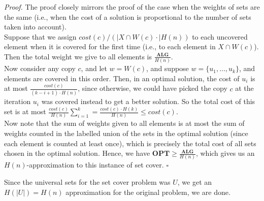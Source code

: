 \documentclass[a4paper]{article}
\newenvironment{proof}{\begin{breakbox}\textit{Proof.}}{\hfill$\square$\end{breakbox}}
\newcommand{\nl}{\vspace{0.2cm}\\}
\newcommand{\OPT}{\mathbf{OPT}}
\newcommand{\ALG}{\mathbf{ALG}}
\begin{document}
\begin{proof}
    The proof closely mirrors the proof of the case when the weights of sets are the same (i.e., when the cost of a solution is proportional to the number of sets taken into account).\nl
    Suppose that we assign $cost(c) / (|X \cap W(c)\cdot |H(n))$ to each uncovered element when it is covered for the first time (i.e., to each element in $X \cap W(c)$). Then the total weight we give to all
    elements is $\frac{\ALG}{H(n)}$.\nl
    Now consider any copy $c$, and let $w = W(c)$, and suppose $w = \{u_1, \ldots, u_k\}$, and elements are covered in this order. Then, in an optimal solution, the cost of $u_i$ is at most
    $\frac{cost(c)}{(k - i + 1) \cdot H(n)}$, since otherwise, we could have picked the copy $c$ at the iteration $u_i$ was covered instead to get a better solution. So the total cost of this set
    is at most $\frac{cost(c)}{H(n)} \sum_{i = 1}^k = \frac{cost(c) \cdot H(k)}{H(n)} \le cost(c)$.\nl
    Now note that the sum of weights given to all elements is at most the sum of weights counted in the labelled union of the sets in the optimal solution (since each element is counted at
    least once), which is precisely the total cost of all sets chosen in the optimal solution. Hence, we have $\OPT \ge \frac{\ALG}{H(n)}$, which gives us an $H(n)$-approximation to this
    instance of set cover.
\end{proof}
Since the universal sets for the set cover problem was $U$, we get an $H(|U|) = H(n)$ approximation for the original problem, we are done.
\end{document}
